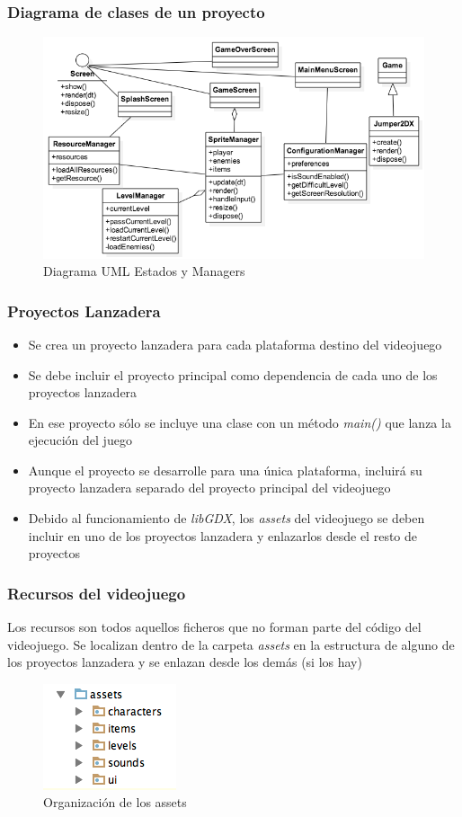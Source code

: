 \documentclass[xcolor={dvipsnames}]{beamer}
\begin{document}
\begin{frame}[plain]\frametitle{Diagrama de clases de un proyecto}
    \begin{figure}
    \includegraphics[scale=0.5]{images/uml_game} 
    \caption{Diagrama UML Estados y Managers}
    \end{figure}
\end{frame}


\begin{frame}\frametitle{Proyectos Lanzadera}
	\begin{itemize}
		\item Se crea un proyecto lanzadera para cada plataforma destino del videojuego
		\item Se debe incluir el proyecto principal como dependencia de cada uno de los proyectos lanzadera
		\item En ese proyecto sólo se incluye una clase con un método \emph{main()} que lanza la ejecución del juego
		\item Aunque el proyecto se desarrolle para una única plataforma, incluirá su proyecto lanzadera separado del proyecto principal del videojuego
		\item Debido al funcionamiento de \emph{\textcolor{resalta}{libGDX}}, los \emph{assets} del videojuego se deben incluir en uno de los proyectos lanzadera y enlazarlos desde el resto de proyectos
	\end{itemize}
\end{frame}

\begin{frame}\frametitle{Recursos del videojuego}
    Los recursos son todos aquellos ficheros que no forman parte del código del videojuego. Se localizan dentro de la carpeta
    \emph{\textcolor{resalta}{assets}} en la estructura de alguno de los proyectos lanzadera y se enlazan desde los demás (si los hay)
    \begin{figure}
    \includegraphics[scale=0.65]{images/assets} 
    \caption{Organización de los assets}
    \end{figure}
\end{frame}
\end{document}
